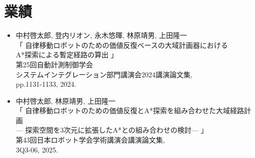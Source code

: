 \chapter*{業績}

\begin{itemize}
  \item 中村啓太郎, 登内リオン, 永木悠暉, 林原靖男, 上田隆一
        \\ 「 自律移動ロボットのための価値反復ベースの大域計画器における
	\\ A*探索による暫定経路の算出 」
        \\ 第25回自動計測制御学会
	\\ システムインテグレーション部門講演会2024講演論文集,
        \\ pp.1131-1133, 2024.
\end{itemize}

\begin{itemize}
  \item 中村啓太郎, 林原靖男, 上田隆一
        \\ 「 自律移動ロボットのための価値反復とA*探索を組み合わせた大域経路計画
        \\ --- 探索空間を3次元に拡張したA*との組み合わせの検討--- 」
        \\ 第43回日本ロボット学会学術講演会講演論文集,
        \\ 3Q3-06, 2025.
\end{itemize}
